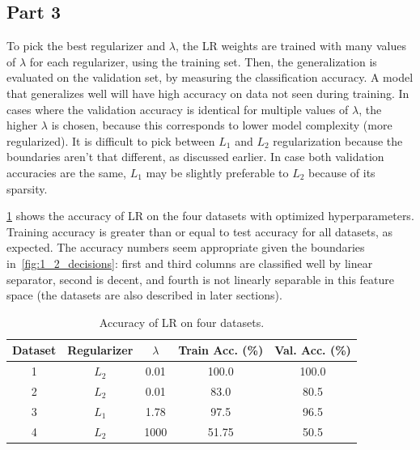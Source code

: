 \subsection{Part 3}
To pick the best regularizer and $\lambda$, the LR weights are trained with many values of $\lambda$ for each regularizer, using the training set.
Then, the generalization is evaluated on the validation set, by measuring the classification accuracy.
A model that generalizes well will have high accuracy on data not seen during training.
In cases where the validation accuracy is identical for multiple values of $\lambda$, the higher $\lambda$ is chosen, because this corresponds to lower model complexity (more regularized).
It is difficult to pick between $L_1$ and $L_2$ regularization because the boundaries aren't that different, as discussed earlier.
In case both validation accuracies are the same, $L_1$ may be slightly preferable to $L_2$ because of its sparsity.

\cref{table_lr_1_3} shows the accuracy of LR on the four datasets with optimized hyperparameters.
Training accuracy is greater than or equal to test accuracy for all datasets, as expected.
The accuracy numbers seem appropriate given the boundaries in~\cref{fig:1_2_decisions}: first and third columns are classified well by linear separator, second is decent, and fourth is not linearly separable in this feature space (the datasets are also described in later sections).


\begin{table}[ht!]
\centering
\begin{tabular}{||c c c c c||}  
 \hline
 Dataset & Regularizer & $\lambda$ & Train Acc. (\%) & Val. Acc. (\%) \\ [0.3ex] 
 \hline\hline
 1 & $L_2$ & 0.01 & 100.0 & 100.0 \\ 
 \hline
 2 & $L_2$ & 0.01 & 83.0 & 80.5 \\ 
 \hline
 3 & $L_1$ & 1.78 & 97.5 & 96.5 \\ 
 \hline
 4 & $L_2$ & 1000 & 51.75 & 50.5 \\ 
 \hline
\end{tabular}
\caption{Accuracy of LR on four datasets.}
\label{table_lr_1_3}
\end{table}
